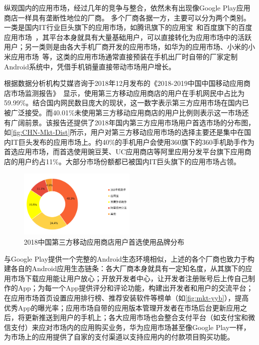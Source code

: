 纵观国内的应用市场，经过几年的竞争与整合，依然未有出现像Google Play应用商店一样具有垄断性地位的厂商。
多个厂商各据一方，主要可以分为两个类别。
一类是国内IT行业巨头旗下的应用市场，如腾讯旗下的应用宝~\cite{Myapp}和百度旗下的百度应用市场~\cite{Baiduappstore}，其平台本身就具有大量基础用户，可以直接转化为应用市场中的活跃用户；另一类则是由各大手机厂商开发的应用市场，如华为的应用市场、小米的小米应用市场~\cite{Xiaomiappstore}等，这类的应用市场通常直接预装在手机出厂时自带的厂家定制Android系统中，凭借手机销量直接带动市场用户增长。

根据数据分析机构艾媒咨询于2018年12月发布的《2018-2019中国中国移动应用商店市场监测报告》~\cite{ChineseAppStoreReport}显示，使用第三方移动应用商店的用户在手机网民中占比为59.99\%。结合国内网民数目庞大的现状，这一数字表示第三方应用市场在国内已被广泛接受。而40.01\%未使用第三方移动应用商店的用户比例则表示这一市场还有广阔前景。该报告还提供了2018年国内第三方应用市场用户首选市场的分布图，如\autoref{fig:CHN-Mkt-Dist}所示，用户对第三方移动应用市场的选择主要还是集中在国内IT巨头发布的应用市场上。约40\%的手机用户会使用360旗下的360手机助手作为首选应用市场，而首选使用豌豆荚、UC应用商店等阿里应用分发平台旗下应用商店的用户约占11\%。大部分市场份额都已被国内IT巨头旗下的应用市场占领。

\begin{figure}[htbp]
	\centering
	\includegraphics[width=0.5\textwidth]{./Figures/edwin-CHN-mkt-dist.png}
	\caption{2018中国第三方移动应用商店用户首选使用品牌分布}
	\label{fig:CHN-Mkt-Dist}
\end{figure}

与Google Play提供一个完整的Android生态环境相似，上述的各个厂商也致力于构建各自的Android应用生态链条：各大厂商本身就具有一定知名度，从其旗下的应用市场下载应用能让用户放心；开放开发者中心，让开发者注册账号后上传自己制作的App；为每一个App提供评分和评论功能，构建出开发者和用户的交流平台；在应用市场首页设置应用排行榜、推荐安装软件等榜单（如\autoref{fig:mkt-yyb}），提高优秀App的曝光率；应用市场自带的应用版本管理开发者在市场后台更新应用之后，将更新推送到用户的手机上；各大应用市场也会整合支付平台（如支付宝和微信支付）来应对市场内的应用购买业务，华为应用市场甚至像Google Play一样，为市场上的应用提供了自家的支付渠道以支持应用内的付款项目购买功能。

